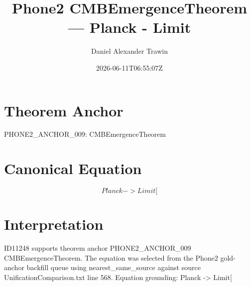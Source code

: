 \documentclass[11pt]{article}
\title{Phone2 CMBEmergenceTheorem — Planck - Limit}
\author{Daniel Alexander Trawin}
\date{2026-06-11T06:55:07Z}
\begin{document}
\maketitle
\section*{Theorem Anchor}
PHONE2_ANCHOR_009: CMBEmergenceTheorem
\section*{Canonical Equation}
\[
Planck -> Limit[
\]
\section*{Interpretation}
ID11248 supports theorem anchor PHONE2_ANCHOR_009 CMBEmergenceTheorem. The equation was selected from the Phone2 gold-anchor backfill queue using nearest_same_source against source UnificationComparison.txt line 568. Equation grounding: Planck -> Limit[
\end{document}
